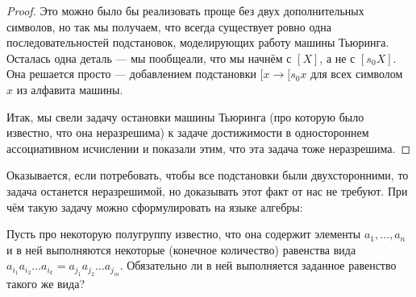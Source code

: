 \documentclass{article}
\begin{document}
\begin{proof}
	Это можно было бы реализовать проще без двух дополнительных символов, но так мы получаем, что всегда существует ровно одна последовательностей подстановок, моделирующих работу машины Тьюринга. Осталась одна деталь --- мы пообщеали, что мы начнём с $[X]$, а не с $[s_0X]$. Она решается просто --- добавлением подстановки $[x \to [s_0x$ для всех символом $x$ из алфавита машины. 

	Итак, мы свели задачу остановки машины Тьюринга (про которую было известно, что она неразрешима) к задаче достижимости в одностороннем ассоциативном исчислении и показали этим, что эта задача тоже неразрешима.
\end{proof}
Оказывается, если потребовать, чтобы все подстановки были двухсторонними, то задача останется неразрешимой, но доказывать этот факт от нас не требуют. При чём такую задачу можно сформулировать на языке алгебры:

Пусть про некоторую полугруппу известно, что она содержит элементы $a_1, \ldots, a_n$ и в ней выполняются некоторые (конечное количество) равенства вида $a_{i_1}a_{i_2}\ldots a_{i_k} = a_{j_1}a_{j_2}\ldots a_{j_m}$. Обязательно ли в ней выполняется заданное равенство такого же вида?
\end{document}
